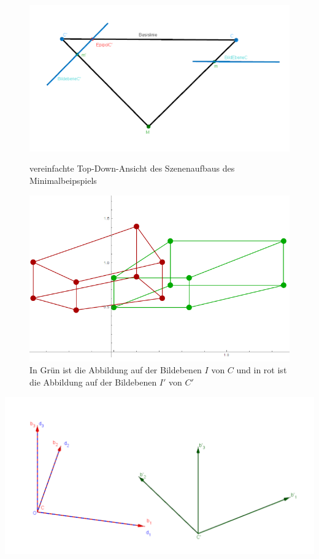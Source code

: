 \begin{figure}[!htb]
	\includegraphics[width=\linewidth]{images/AufbauMinimalbeispiel.png}
	\caption{vereinfachte Top-Down-Ansicht des Szenenaufbaus des Minimalbeipspiels}
	\label{fig:aufbauMinimalTopDown}
	\endminipage\hfill
	\includegraphics[width=\linewidth]{images/QuadrateMinimalBeispiel.png}
	\caption{In Grün ist die Abbildung auf der Bildebenen $I$ von $C$ und in rot ist die Abbildung auf der Bildebenen $I'$ von $C'$}
	\label{fig:AbbildungenMinimal}
	\endminipage\hfill
\end{figure}

\begin{minipage}{\linewidth}
	\centering
	\includegraphics[width=.52\linewidth]{images/KS_Minimalbeispiel.png}
	\label{fig:KoordsystemeMinimal}
\end{minipage}\\ \\

